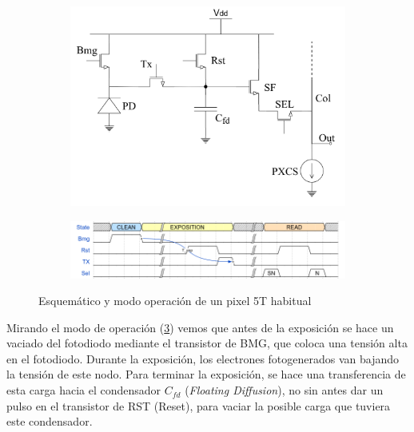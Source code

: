 \begin{figure}[h]
	\centering
	\begin{subfigure}{0.6\textwidth}
		\includegraphics[width=\textwidth]{img/pixel_5T.png}
		\caption{}
		\label{fig:pixel}
	\end{subfigure}

	\begin{subfigure}{\textwidth}
		\includegraphics[width=\textwidth]{img/pixel_wave.png}
		\caption{}
		\label{fig:pixel_op}
	\end{subfigure}
	\caption{Esquemático y modo operación de un pixel 5T habitual}
\end{figure}

Mirando el modo de operación (\ref{fig:pixel_op}) vemos que antes de la exposición se hace un vaciado del
fotodiodo mediante el transistor de BMG, que coloca una tensión alta en el fotodiodo.
Durante la exposición, los electrones fotogenerados van bajando la tensión de este
nodo. Para terminar la exposición, se hace una transferencia de esta carga hacia
el condensador $C_{fd}$ (\textit{Floating Diffusion}), no sin antes dar un pulso
en el transistor de RST (Reset), para vaciar la posible carga que tuviera este condensador.\\

